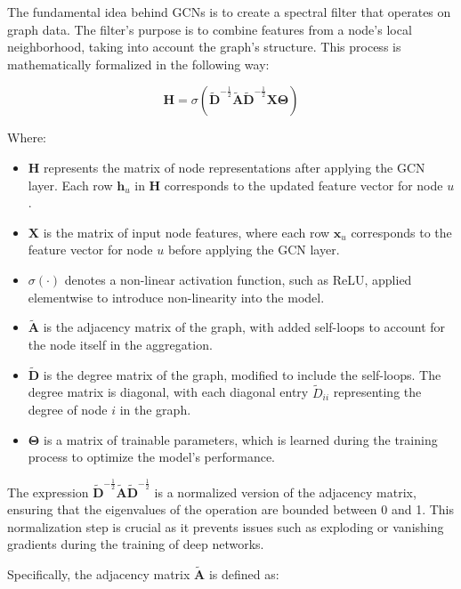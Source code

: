 The fundamental idea behind GCNs is to create a spectral filter that operates on graph data. The filter's purpose is to combine features from a node's local neighborhood, taking into account the graph's structure. This process is mathematically formalized in the following way:

\begin{equation}
 \mathbf{H} = \sigma\left( \tilde{\mathbf{D}}^{-\frac{1}{2}} \tilde{\mathbf{A}} \tilde{\mathbf{D}}^{-\frac{1}{2}} \mathbf{X} \mathbf{\Theta} \right)   
    \label{eq:GCN_filter}
\end{equation}

Where:
\begin{itemize}
    \item \( \mathbf{H} \) represents the matrix of node representations after applying the GCN layer. Each row \( \mathbf{h}_u \) in \( \mathbf{H} \) corresponds to the updated feature vector for node \( u \). 
    \item \( \mathbf{X} \) is the matrix of input node features, where each row \( \mathbf{x}_u \) corresponds to the feature vector for node \( u \) before applying the GCN layer. 
    \item \( \sigma(\cdot) \) denotes a non-linear activation function, such as ReLU, applied elementwise to introduce non-linearity into the model. 
    \item \( \tilde{\mathbf{A}} \) is the adjacency matrix of the graph, with added self-loops to account for the node itself in the aggregation. 
    \item \( \tilde{\mathbf{D}} \) is the degree matrix of the graph, modified to include the self-loops. The degree matrix is diagonal, with each diagonal entry \( \tilde{D}_{ii} \) representing the degree of node \( i \) in the graph. 
    \item \( \mathbf{\Theta} \) is a matrix of trainable parameters, which is learned during the training process to optimize the model's performance.


\end{itemize}

The expression \( \tilde{\mathbf{D}}^{-\frac{1}{2}} \tilde{\mathbf{A}} \tilde{\mathbf{D}}^{-\frac{1}{2}} \) is a normalized version of the adjacency matrix, ensuring that the eigenvalues of the operation are bounded between 0 and 1. This normalization step is crucial as it prevents issues such as exploding or vanishing gradients during the training of deep networks.

Specifically, the adjacency matrix \( \tilde{\mathbf{A}} \) is defined as:

